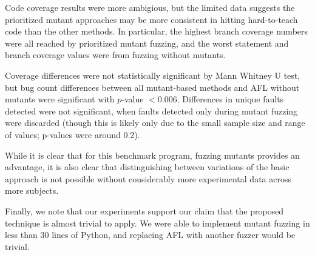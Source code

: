 Code coverage results were more ambigious, but the limited data
suggests the prioritized mutant approaches may be more consistent in
hitting hard-to-teach code than the other methods.  In particular, the highest branch coverage numbers were all reached by prioritized mutant fuzzing, and the worst statement and branch coverage values were from fuzzing without mutants.

Coverage differences were not statistically significant by Mann
Whitney U test, but bug count differences between all mutant-based methods and AFL
without mutants were significant with $p$-value $< 0.006$.
Differences in unique faults detected were not significant, when
faults detected only during mutant fuzzing were discarded (though this
is likely only due to the small sample size and range of values;
p-values were around 0.2).

While it is clear that for this benchmark program, fuzzing mutants
provides an advantage, it is also clear that distinguishing between
variations of the basic approach is not possible without considerably
more experimental data across more subjects.

Finally, we note that our experiments support our claim that the proposed technique is almost trivial to apply. We were able to implement mutant fuzzing in less than 30 lines of Python, and replacing AFL with another fuzzer would be trivial.

